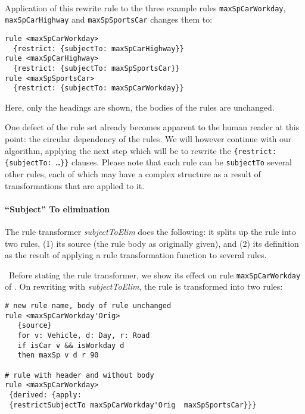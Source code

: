 \begin{example}\label{ex:rewrite_despite}\mbox{}\\
Application of this rewrite rule to the three example rules \texttt{maxSpCarWorkday},
\texttt{maxSpCarHighway} and  \texttt{maxSpSportsCar} changes them to:

\begin{lstlisting}
rule <maxSpCarWorkday>
  {restrict: {subjectTo: maxSpCarHighway}}
rule <maxSpCarHighway>
  {restrict: {subjectTo: maxSpSportsCar}}
rule <maxSpSportsCar>
  {restrict: {subjectTo: maxSpCarWorkday}}
\end{lstlisting}
Here, only the headings are shown, the bodies of the rules are
unchanged. 
\end{example}

One defect of the rule set already becomes apparent to the human reader at
this point: the circular dependency of the rules. We will however continue
with our algorithm, applying the next step which will be to rewrite the
\texttt{\{restrict: \{subjectTo: \dots\}\}} clauses.  Please note that each
rule can be \texttt{subjectTo} several other rules, each of which may have a
complex structure as a result of transformations that are applied to it.


\paragraph{\textbf{``Subject'' To elimination}}

The rule transformer \emph{subjectToElim} does the following: it splits up the
rule into two rules, (1) its source (the rule body as originally given), and
(2) its definition as the result of applying a rule transformation function to
several rules.

\begin{example}\label{ex:rewrite_subject_to}\
Before stating the rule transformer, we show its effect on rule
\texttt{maxSpCarWorkday} of . On rewriting
with \emph{subjectToElim}, the rule is transformed into two rules:

\begin{lstlisting}
# new rule name, body of rule unchanged
rule <maxSpCarWorkday'Orig>
   {source}
   for v: Vehicle, d: Day, r: Road
   if isCar v && isWorkday d
   then maxSp v d r 90

# rule with header and without body
rule <maxSpCarWorkday>
 {derived: {apply: 
 {restrictSubjectTo maxSpCarWorkday'Orig  maxSpSportsCar}}}
\end{lstlisting}
\end{example}

